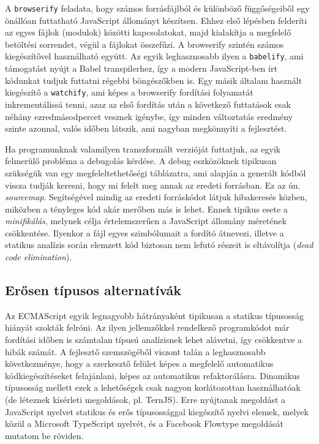 A \texttt{browserify}\cite{browserify} feladata, hogy számos forrásfájlból és
különböző függőségeiből egy önállóan futtatható JavaScript állományt készítsen.
Ehhez első lépésben felderíti az egyes fájlok (modulok) közötti kapcsolatokat,
majd kialakítja a megfelelő betöltési sorrendet, végül a fájlokat összefűzi.  A
browserify szintén számos kiegészítővel használható együtt.  Az egyik
leghasznosabb ilyen a \texttt{babelify}\cite{babelify}, ami támogatást nyújt a
Babel transpilerhez, így a modern JavaScript-ben írt kódunkat tudjuk futtatni
régebbi böngészőkben is.  Egy másik általam használt kiegészítő a
\texttt{watchify}\cite{watchify}, ami képes a browserify fordítási folyamatát
inkrementálissá tenni, azaz az első fordítás után a következő futtatások csak
néhány ezredmásodpercet vesznek igénybe, így minden változtatás eredmény szinte
azonnal, valós időben látszik, ami nagyban megkönnyíti a fejlesztést.

Ha programunknak valamilyen transzformált verzióját futtatjuk, az egyik
felmerülő probléma a debugolás kérdése. A debug eszközöknek tipikusan szükségük
van egy megfeleltethetőségi táblázatra, ami alapján a generált kódból vissza
tudják keresni, hogy mi felelt meg annak az eredeti forrásban. Ez az ún.
\emph{sourcemap}\cite{sourcemap}. Segítségével mindig az eredeti forráskódot
látjuk hibakeresés közben, miközben a tényleges kód akár merőben más is lehet.
Ennek tipikus esete a \emph{minifikálás}, melynek célja értelemszerűen a
JavaScript állomány méretének csökkentése.  Ilyenkor a fájl egyes szimbólumait a
fordító átnevezi, illetve a statikus analízis során elemzett kód biztosan nem
lefutó részeit is eltávolítja (\emph{dead code elimination}).

\subsection{Erősen típusos alternatívák}

Az ECMAScript egyik legnagyobb hátrányaként tipikusan a statikus típusosság
hiányát szokták felróni.  Az ilyen jellemzőkkel rendelkező programkódot már
fordítási időben is számtalan típusú analízisnek lehet alávetni, így csökkentve
a hibák számát.  A fejlesztő szemszögéből viszont talán a leghasznosabb
következménye, hogy a szerkesztő felület képes a megfelelő automatikus
kódkiegészítéseket felajánlani, képes az automatikus refaktorálásra.  Dinamikus
típusosság mellett ezek a lehetőségek csak nagyon korlátozottan használhatóak
(de léteznek kísérleti megoldások, pl. TernJS\cite{tern}).  Erre nyújtanak
megoldást a JavaScript nyelvet statikus és erős típusossággal kiegészítő nyelvi
elemek, melyek közül a Microsoft TypeScript nyelvét, és a Facebook Flowtype
megoldását mutatom be röviden.

